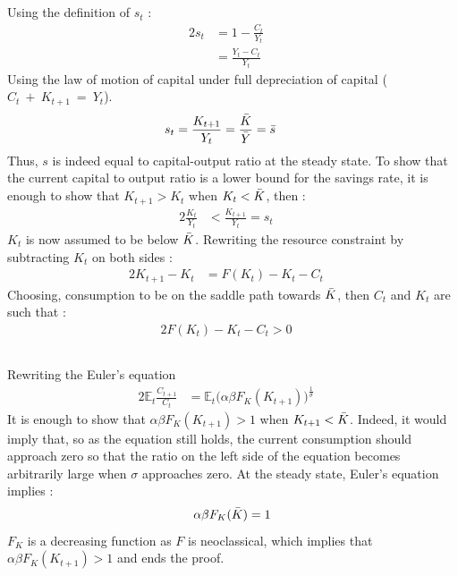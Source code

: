 \documentclass[12pt]{article}
\begin{document}
\subsection{}
Using the definition of $s_t$ :
\begin{alignat*}{2}
    s_t &= 1 - \frac{C_t}{Y_t} \quad\\
        &= \frac{Y_t - C_t}{Y_t} \quad
\end{alignat*}
Using the law of motion of capital under full depreciation of capital ($C_t~+~K_{t+1}~=~Y_t$).
\begin{alignat*}{2}
    s_t &= \frac{K_{t+1}}{Y_t} = \frac{\Bar{K}}{\Bar{Y}} = \Bar{s} \quad
\end{alignat*}
Thus, $s$ is indeed equal to capital-output ratio at the steady state.\newline
To show that the current capital to output ratio is a lower bound for the savings rate, it is enough to show that $K_{t+1} > K_t$ when $K_t < \Bar{K}$, then :
\begin{alignat*}{2}
    \frac{K_{t}}{Y_t} &< \frac{K_{t+1}}{Y_t} = s_t \quad
\end{alignat*}
$K_t$ is now assumed to be below $\Bar{K}$. Rewriting the resource constraint by subtracting $K_t$ on both sides :
\begin{alignat*}{2}
    K_{t+1} - K_t &= F(K_t) - K_t - C_t \quad
\end{alignat*}
Choosing, consumption to be on the saddle path towards $\Bar{K}$, then $C_t$ and $K_t$ are such that :
\begin{alignat*}{2}
    F(K_t) - K_t - C_t > 0 \quad
\end{alignat*}
\subsection{}
Rewriting the Euler's equation
\begin{alignat*}{2}
    \mathbb{E}_{t} \frac{C_{t+1}}{C_{t}} &=  \mathbb{E}_{t} \big( \alpha \beta F_K(K_{t+1}) \big)^{\frac{1}{\sigma}} \quad
\end{alignat*}
It is enough to show that $\displaystyle \alpha \beta F_K(K_{t+1}) > 1$ when $K_{t+1} < \Bar{K}$. \newline
Indeed, it would imply that, so as the equation still holds, the current consumption should approach zero so that the ratio on the left side of the equation becomes arbitrarily large when $\sigma$ approaches zero. \newline
At the steady state, Euler's equation implies :
$$\alpha \beta F_K(\Bar{K}) = 1$$
$F_K$ is a decreasing function as $F$ is neoclassical, which implies that $\displaystyle \alpha \beta F_K(K_{t+1}) > 1$ and ends the proof.
\end{document}
